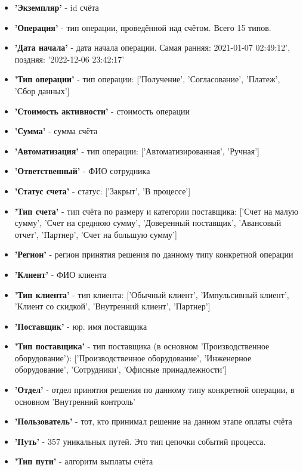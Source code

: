 \documentclass[12pt]{article}
\begin{document}
\begin{itemize}
    \item \textbf{'Экземпляр'} - id счёта

    \item \textbf{'Операция'} - тип операции, проведённой над счётом. Всего 15 типов.

    \item \textbf{'Дата начала'} - дата начала операции. Самая ранняя: 2021-01-07 02:49:12', поздняя: '2022-12-06 23:42:17'

    \item \textbf{'Тип операции'} - тип операции: ['Получение', 'Согласование', 'Платеж', 'Сбор данных']

    \item \textbf{'Стоимость активности'} - стоимость операции

    \item \textbf{'Сумма'} - сумма счёта

    \item \textbf{'Автоматизация'} - тип операции: ['Автоматизированная', 'Ручная']

    \item \textbf{'Ответственный'} - ФИО сотрудника

    \item \textbf{'Статус счета'} - статус: ['Закрыт', 'В процессе']

    \item \textbf{'Тип счета'} - тип счёта по размеру и категории поставщика: ['Счет на малую сумму', 'Счет на среднюю сумму', 'Доверенный поставщик', 'Авансовый отчет', 'Партнер', 'Счет на большую сумму']

    \item \textbf{'Регион'} - регион принятия решения по данному типу конкретной операции

    \item \textbf{'Клиент'} - ФИО клиента

    \item \textbf{'Тип клиента'} - тип клиента: ['Обычный клиент', 'Импульсивный клиент', 'Клиент со скидкой', 'Внутренний клиент', 'Партнер']

    \item \textbf{'Поставщик'} - юр. имя поставщика

    \item \textbf{'Тип поставщика'} - тип поставщика (в основном 'Производственное оборудование'): ['Производственное оборудование', 'Инженерное оборудование', 'Сотрудники', 'Офисные принадлежности']

    \item \textbf{'Отдел'} - отдел принятия решения по данному типу конкретной операции, в основном 'Внутренний контроль'

    \item \textbf{'Пользователь'} - тот, кто принимал решение на данном этапе оплаты счёта

    \item \textbf{'Путь'} - 357 уникальных путей. Это тип цепочки событий процесса.

    \item \textbf{'Тип пути'} - алгоритм выплаты счёта
\end{itemize}
\end{document}
